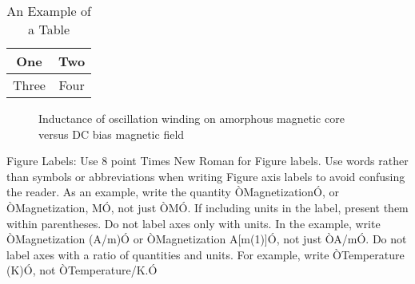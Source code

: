\documentclass[letterpaper, 10 pt, conference]{ieeeconf}  %
\begin{document}
                                        \begin{table}[h]
                                            \caption{An Example of a Table}
                                            \label{table_example}
                                            \begin{center}
                                                \begin{tabular}{|c||c|}
                                                    \hline
                                                    One & Two\\
                                                    \hline
                                                    Three & Four\\
                                                    \hline
                                                \end{tabular}
                                            \end{center}
                                        \end{table}


                                           \begin{figure}[thpb]
                                                     \centering
                                                                 \caption{Inductance of oscillation winding on amorphous
                                                                            magnetic core versus DC bias magnetic field}
                                                                                  \label{figurelabel}
                                                                                     \end{figure}
                                                                                        

                                                                                     Figure Labels: Use 8 point Times New Roman for Figure labels. Use words rather than symbols or abbreviations when writing Figure axis labels to avoid confusing the reader. As an example, write the quantity ÒMagnetizationÓ, or ÒMagnetization, MÓ, not just ÒMÓ. If including units in the label, present them within parentheses. Do not label axes only with units. In the example, write ÒMagnetization (A/m)Ó or ÒMagnetization {A[m(1)]}Ó, not just ÒA/mÓ. Do not label axes with a ratio of quantities and units. For example, write ÒTemperature (K)Ó, not ÒTemperature/K.Ó
\end{document}
